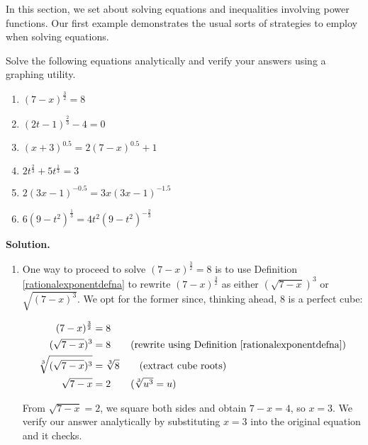 

\setcounter{footnote}{0}

\label{PowerEqIneq}

In this section, we set about solving equations and inequalities involving power functions.  Our first example demonstrates the usual sorts of strategies to employ when solving equations.

\begin{ex} \label{powerequationex}  Solve the following equations analytically and verify your answers using a graphing utility.


\begin{enumerate}

\item \label{first} $(7-x)^{\frac{3}{2}} = 8$ 
\item \label{second} $(2t-1)^{\frac{2}{3}} -4 = 0$

\item $(x+3)^{0.5} = 2(7-x)^{0.5}+1$ 
\item $2t^{\frac{2}{3}} + 5t^{\frac{1}{3}} = 3$

\item $2(3x-1)^{-0.5}  = 3x (3x-1)^{-1.5}$ 
\item $6(9-t^2)^{\frac{1}{3}} = 4t^2 (9-t^2)^{-\frac{2}{3}}$

\end{enumerate}

{\bf Solution.}

\begin{enumerate}

\item  One way to proceed to solve  $(7-x)^{\frac{3}{2}} = 8$ is to use Definition \ref{rationalexponentdefna} to rewrite $(7-x)^{\frac{3}{2}}$ as either $(\sqrt{7-x})^3$ or $\sqrt{(7-x)^3}$.  We opt for the former since, thinking ahead,  $8$ is a perfect cube: 

\begin{align*}
(7-x)^{\frac{3}{2}} & = 8 \\
(\sqrt{7-x})^3 & = 8 \tag{rewrite using Definition \ref{rationalexponentdefna}} \\
\sqrt[3]{(\sqrt{7-x})^3} & = \sqrt[3]{8} \tag{extract cube roots}  \\
\sqrt{7-x} & = 2 \tag{$\sqrt[3]{u^3}= u$}
\end{align*}

From $\sqrt{7-x} =  2$, we square both sides and obtain $7-x = 4$, so $x = 3$.  We verify our answer analytically by substituting $x=3$ into the original equation and it checks.


\end{enumerate}
\end{ex}
